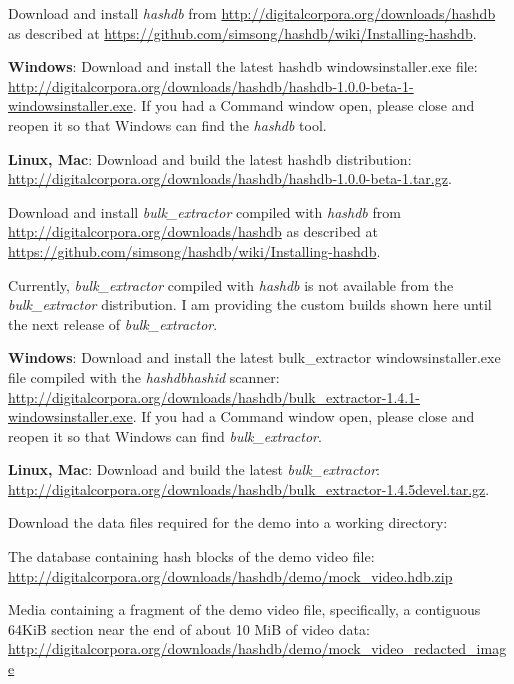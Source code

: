 \documentclass[12pt,twoside]{article}
\newcommand{\hdb}{\emph{hashdb}\xspace}
\newcommand{\bulk}{\emph{bulk\_extractor}\xspace}
\newcommand{\hashid}{\emph{hashid}\xspace}
\begin{document}
\begin{compactenum}
\item Download and install \hdb from
\url{http://digitalcorpora.org/downloads/hashdb}
as described at
\url{https://github.com/simsong/hashdb/wiki/Installing-hashdb}.
  \begin{compactitem}
  \item \textbf{Windows}: Download and install the latest hashdb windowsinstaller.exe file:
  \url{http://digitalcorpora.org/downloads/hashdb/hashdb-1.0.0-beta-1-windowsinstaller.exe}.
If you had a Command window open, please close and reopen it
so that Windows can find the \hdb tool.

  \item \textbf{Linux, Mac}: Download and build the latest hashdb distribution:
  \url{http://digitalcorpora.org/downloads/hashdb/hashdb-1.0.0-beta-1.tar.gz}.
  \end{compactitem}
\item Download and install \bulk compiled with \hdb from
\url{http://digitalcorpora.org/downloads/hashdb}
as described at
\url{https://github.com/simsong/hashdb/wiki/Installing-hashdb}.

Currently, \bulk compiled with \hdb
is not available from the \bulk distribution.
I am providing the custom builds shown here until the next release of \bulk.
  \begin{compactitem}
  \item \textbf{Windows}: Download and install the latest
  bulk\_extractor windowsinstaller.exe file
  compiled with the \hdb \hashid scanner:
  \url{http://digitalcorpora.org/downloads/hashdb/bulk\_extractor-1.4.1-windowsinstaller.exe}.
If you had a Command window open, please close and reopen it
so that Windows can find \bulk.
  \item \textbf{Linux, Mac}: Download and build the latest \bulk:
  \url{http://digitalcorpora.org/downloads/hashdb/bulk\_extractor-1.4.5devel.tar.gz}.
  \end{compactitem}

\item Download the data files required for the demo into a working directory:
  \begin{compactitem}
  \item The database containing hash blocks of the demo video file:
  \url{http://digitalcorpora.org/downloads/hashdb/demo/mock\_video.hdb.zip}
  \item Media containing a fragment of the demo video file,
  specifically, a contiguous 64KiB section
  near the end of about 10 MiB of video data:
  \url{http://digitalcorpora.org/downloads/hashdb/demo/mock\_video\_redacted\_image}
  \end{compactitem}


\end{compactenum}
\end{document}
